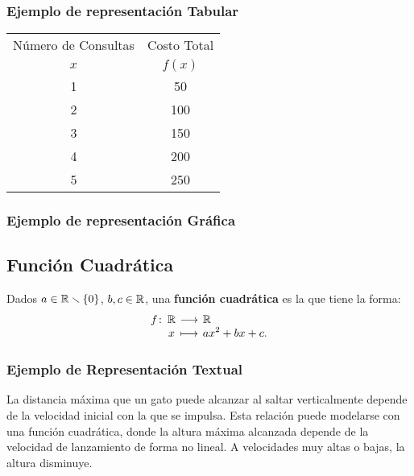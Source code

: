 \documentclass[a4,11pt]{aleph-notas}
\begin{document}
\subsubsection*{Ejemplo de representación Tabular}

\begin{center}\small
\begin{tabular}{@{}cc@{}}
\toprule
Número de Consultas & Costo Total \\
$x$ & $f(x)$\\
\midrule
1 & 50 \\
2 & 100 \\
3 & 150 \\
4 & 200 \\
5 & 250 \\
\bottomrule
\end{tabular}
\end{center}

\subsubsection*{Ejemplo de representación Gráfica}
\begin{center}
\end{center}

\subsection*{Función Cuadrática}

\begin{defi}  
Dados $a \in \mathbb{R} \smallsetminus \{0\}$, $b,c\in\mathbb{R}$, una \textbf{función cuadrática} es la que tiene la forma:
\[
\funcion{f}{\R}{\R}{x}{ax^2 + bx + c.}
\]
\end{defi}

\subsubsection*{Ejemplo de Representación Textual}  
La distancia máxima que un gato puede alcanzar al saltar verticalmente depende de la velocidad inicial con la que se impulsa. Esta relación puede modelarse con una función cuadrática, donde la altura máxima alcanzada depende de la velocidad de lanzamiento de forma no lineal. A velocidades muy altas o bajas, la altura disminuye.
\end{document}
